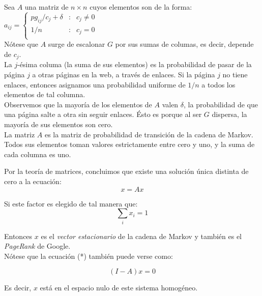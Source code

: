 \documentclass[letterpaper,11pt]{article}
\begin{document}
Sea $A$ una matriz de $n \times n$ cuyos elementos son de la forma:\\

$a_{ij} = \left\{ \begin{array}{rcl}
pg_{ij}/c_j + \delta & : & c_j \neq 0\\
1/n & : & c_j = 0\\
\end{array}\right.$\\

Nótese que $A$ surge de escalonar $G$ por sus sumas de columas, es decir, depende de $c_j$. \\

La $j$-ésima columa (la suma de sus elementos) es la probabilidad de pasar de la página $j$ a otras páginas en la web, a través de enlaces. Si la página $j$ no tiene enlaces, entonces asignamos una probabilidad uniforme de $1/n$ a todos los elementos de tal columna.\\

Observemos que la mayoría de los elementos de $A$ valen $\delta$, la probabilidad de que una página salte a otra sin seguir enlaces. Ésto es porque al ser $G$ dispersa, la mayoría de sus elementos son cero.\\

La matriz $A$ es la matriz de probabilidad de transición de la cadena de Markov. Todos sus elementos toman valores estrictamente entre cero y uno, y la suma de cada columna es uno. \\

\newpage

Por la teoría de matrices, concluimos que existe una solución única distinta de cero a la ecuación:\\
\begin{equation}\tag{*}
	x = Ax
\end{equation}

Si este factor es elegido de tal manera que:\\
\begin{equation*}
	\displaystyle \sum _i x_i = 1 
\end{equation*}

Entonces $x$ es el \textit{vector estacionario} de la cadena de Markov y también es el \textit{PageRank} de Google. \\

Nótese que la ecuación (*) también puede verse como:

$$(I-A)x=0$$

Es decir, $x$ está en el espacio nulo de este sistema homogéneo.\\
\end{document}
